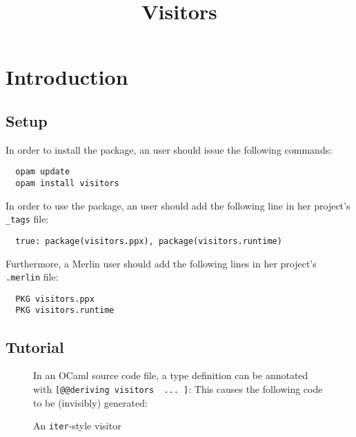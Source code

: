 \documentclass[onecolumn,11pt,nocopyrightspace]{sigplanconf}
\title{Visitors}
\begin{document}
\maketitle


\clearpage


\section{Introduction}

\subsection{Setup}

In order to install the \visitors package, an \opam user should issue the
following commands:
\begin{verbatim}
  opam update
  opam install visitors
\end{verbatim}
In order to use the \visitors package, an \ocamlbuild user should add the
following line in her project's \texttt{\_tags} file:
\begin{lstlisting}
  true: package(visitors.ppx), package(visitors.runtime)
\end{lstlisting}
Furthermore, a Merlin user should add the following lines in her project's
\texttt{.merlin} file:
\begin{lstlisting}
  PKG visitors.ppx
  PKG visitors.runtime
\end{lstlisting}

\subsection{Tutorial}


\begin{figure}[t]
In an OCaml source code file, a type definition can be annotated with
\texttt{[@@deriving visitors { ... }]}:
This causes the following code to be (invisibly) generated:
\caption{An \texttt{iter}-style visitor}
\label{fig:expr00}
\end{figure}
\end{document}
